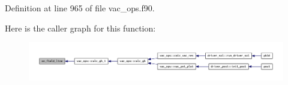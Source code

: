 Definition at line 965 of file vac\+\_\+ops.\+f90.

Here is the caller graph for this function\+:\nopagebreak
\begin{figure}[H]
\begin{center}
\leavevmode
\includegraphics[width=350pt]{vac__ops_8f90_a3d8bbdba782171b063ad415370c8be48_icgraph}
\end{center}
\end{figure}
